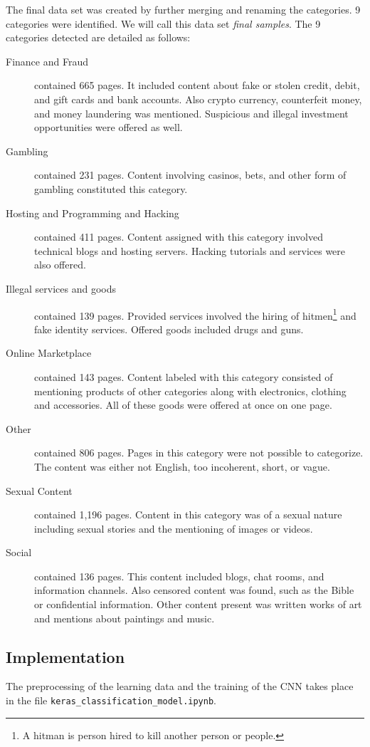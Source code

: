 The final data set was created by further merging and renaming the categories. 9 categories were identified. We will call this data set \textit{final samples}. The 9 categories detected are detailed as follows:
 \label{classificationCategories}
\begin {description}
	\item[Finance and Fraud] contained 665 pages. It included content about fake or stolen credit, debit, and gift cards and bank accounts. Also crypto currency, counterfeit money, and money laundering was mentioned. Suspicious and illegal investment opportunities were offered as well.
	\item[Gambling] contained 231 pages. Content involving casinos, bets, and other form of gambling constituted this category.
	\item[Hosting and Programming and Hacking] contained 411 pages. Content assigned with this category involved technical blogs and hosting servers. Hacking tutorials and services were also offered.
	\item[Illegal services and goods] contained 139 pages. Provided services involved the hiring of hitmen\footnote{A hitman is person hired to kill another person or people.} and fake identity services. Offered goods included drugs and guns.
	\item[Online Marketplace] contained 143 pages. Content labeled with this category consisted of mentioning products of other categories along with electronics, clothing and accessories. All of these goods were offered at once on one page.
	\item[Other] contained 806 pages. Pages in this category were not possible to categorize. The content was either not English, too incoherent, short, or vague. 
	\item[Sexual Content] contained 1,196 pages. Content in this category was of a sexual nature including sexual stories and the mentioning of images or videos.
	\item[Social] contained 136 pages. This content included blogs, chat rooms, and information channels. Also censored content was found, such as the Bible or confidential information. Other content present was written works of art and mentions about paintings and music. 
\end{description}

\subsection{Implementation} \label{ClassificationImplementation}
The preprocessing of the learning data and the training of the CNN takes place in the file \texttt{keras\_classification\_model.ipynb}. 

